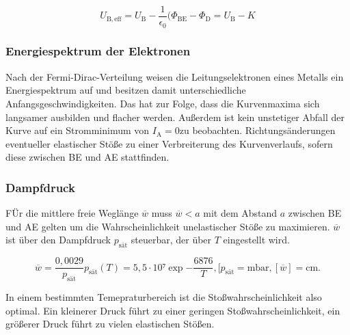 \begin{equation}
	U_\mathup{B,eff}=U_\mathup{B}-\frac{1}{\epsilon_0}(\Phi_	\mathup{BE}-\Phi_\mathup{D}=U_\mathup{B}-K
\end{equation}

\subsubsection{Energiespektrum der Elektronen}

Nach der Fermi-Dirac-Verteilung weisen die Leitungselektronen eines Metalls ein Energiespektrum auf und besitzen damit unterschiedliche Anfangsgeschwindigkeiten.
Das hat zur Folge, dass die Kurvenmaxima sich langsamer ausbilden und flacher werden. 
Außerdem ist kein unstetiger Abfall der Kurve auf ein Stromminimum von $I_\mathup{A}=0$zu beobachten.
Richtungsänderungen eventueller elastischer Stöße zu einer Verbreiterung des Kurvenverlaufs, sofern diese zwischen BE und AE stattfinden. 

\subsubsection{Dampfdruck}

FÜr die mittlere freie Weglänge $\overline{w}$ muss $\overline{w}< a$ mit dem Abstand $a$ zwischen BE und AE gelten um die Wahrscheinlichkeit unelastischer Stöße zu maximieren. 
$\overline{w}$ ist über den Dampfdruck $p_\mathup{sät}$ steuerbar, der über $T$ eingestellt wird. 

\begin{equation}
	\overline{w}=\frac{0,0029}{p_\mathup{sät}}
	p_\mathup{sät}(T)=5,5\cdot 10⁷\exp{-\frac{6876}{T}}, [p_	\mathup{sät}=\si{\milli\bar}, [\overline{w}]=\si{\centi\meter}.
\end{equation}

In einem bestimmten Temepraturbereich ist die Stoßwahrscheinlichkeit also optimal.
 Ein kleinerer Druck führt zu einer geringen Stoßwahrscheinlichkeit, ein größerer Druck führt zu vielen elastischen Stößen.
